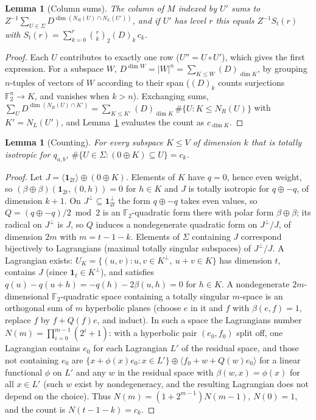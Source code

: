 \documentclass[11pt]{article}
\newcommand{\F}{\mathbb{F}}
\newcommand{\one}{\mathbf 1}
\newtheorem{lemma}[theorem]{Lemma}
\theoremstyle{definition}
\theoremstyle{remark}
\begin{document}
\begin{lemma}[Column sums]\label{lem:col}
The column of $M$ indexed by $U'$ sums to $Z^{-1}\sum_{U\in\Sigma}D^{\dim(N_R(U)\cap N_L(U'))}$, and if $U'$ has
level $r$ this equals $Z^{-1}S_t(r)$ with $S_t(r)=\sum_{k=0}^r\binom rk_2(D)_k\,c_k$.
\end{lemma}
\begin{proof}
Each $U$ contributes to exactly one row ($U''=U\circ U'$), which gives the first expression. For a subspace $W$,
$D^{\dim W}=|W|^n=\sum_{K\le W}(D)_{\dim K}$, by grouping $n$-tuples of vectors of $W$ according to their span ($(D)_k$
counts surjections $\F_2^n\to K$, and vanishes when $k>n$). Exchanging sums,
$\sum_UD^{\dim(N_R(U)\cap K')}=\sum_{K\le K'}(D)_{\dim K}\,\#\{U:K\le N_R(U)\}$ with $K'=N_L(U')$, and
Lemma~\ref{lem:count} evaluates the count as $c_{\dim K}$.
\end{proof}

\begin{lemma}[Counting]\label{lem:count}
For every subspace $K\le V$ of dimension $k$ that is totally isotropic for $q_{a,b}$,
$\#\{U\in\Sigma:(0\oplus K)\subseteq U\}=c_k$.
\end{lemma}
\begin{proof}
Let $J=\langle\one_{2t}\rangle\oplus(0\oplus K)$. Elements of $K$ have $q=0$, hence even weight, so
$(\beta\oplus\beta)(\one_{2t},(0,h))=0$ for $h\in K$ and $J$ is totally isotropic for $q\oplus-q$, of dimension $k+1$.
On $J^\perp\subseteq\one_{2t}^\perp$ the form $q\oplus-q$ takes even values, so $Q=(q\oplus-q)/2\bmod2$ is an
$\F_2$-quadratic form there with polar form $\beta\oplus\beta$; its radical on $J^\perp$ is $J$, so $Q$ induces a
nondegenerate quadratic form on $J^\perp/J$, of dimension $2m$ with $m=t-1-k$. Elements of $\Sigma$ containing $J$
correspond bijectively to Lagrangians (maximal totally singular subspaces) of $J^\perp/J$. A Lagrangian exists:
$U_K=\{(u,v):u,v\in K^\perp,\ u+v\in K\}$ has dimension $t$, contains $J$ (since $\one_t\in K^\perp$), and satisfies
$q(u)-q(u+h)=-q(h)-2\beta(u,h)=0$ for $h\in K$. A nondegenerate $2m$-dimensional $\F_2$-quadratic space containing a
totally singular $m$-space is an orthogonal sum of $m$ hyperbolic planes (choose $e$ in it and $f$ with
$\beta(e,f)=1$, replace $f$ by $f+Q(f)e$, and induct). In such a space the Lagrangians number $N(m)=\prod_{i=0}^{m-1}
(2^i+1)$: with a hyperbolic pair $(e_0,f_0)$ split off, one Lagrangian contains $e_0$ for each Lagrangian $L'$ of the
residual space, and those not containing $e_0$ are $\{x+\phi(x)e_0:x\in L'\}\oplus\langle f_0+w+Q(w)e_0\rangle$ for
a linear functional $\phi$ on $L'$ and any $w$ in the residual space with $\beta(w,x)=\phi(x)$ for all $x\in L'$
(such $w$ exist by nondegeneracy, and the resulting Lagrangian does not depend on the choice). Thus
$N(m)=(1+2^{m-1})N(m-1)$, $N(0)=1$, and the count is $N(t-1-k)=c_k$.
\end{proof}
\end{document}
